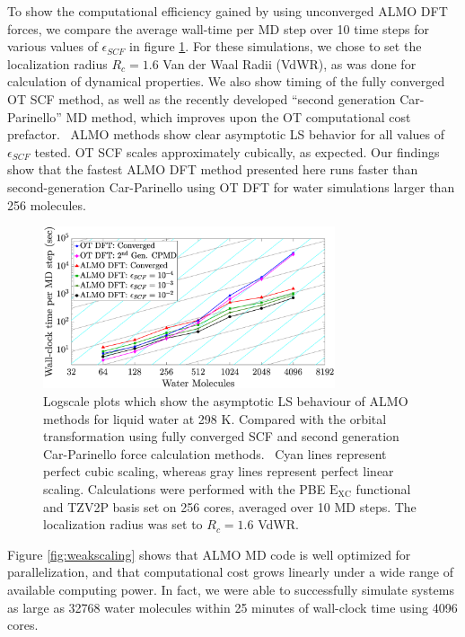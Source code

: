 \documentclass[10pt,aps,prl,twocolumn,amsmath,amssymb,superscriptaddress,longbibliography]{revtex4-1}
\begin{document}

To show the computational efficiency gained by using unconverged ALMO DFT forces, we compare the average wall-time per MD step over 10 time steps for various values of $\epsilon_{SCF}$ in figure \ref{fig:strongscaling_log}.
For these simulations, we chose to set the localization radius $R_{c} = 1.6$ Van der Waal Radii (VdWR), as was done for calculation of dynamical properties.
We also show timing of the fully converged OT SCF method, as well as the recently developed ``second generation Car-Parinello'' MD method, which improves upon the OT computational cost prefactor.~\cite{a:2ndcpmd}
ALMO methods show clear asymptotic LS behavior for all values of $\epsilon_{SCF}$ tested.
OT SCF scales approximately cubically, as expected.
Our findings show that the fastest ALMO DFT method presented here runs faster than second-generation Car-Parinello using OT DFT for water simulations larger than 256 molecules.

\begin{figure}
\includegraphics[trim={2.5cm 0.5cm 3.4cm 0.1cm},clip,width=8.6cm]{strongscaling_log.eps}
\caption{\label{fig:strongscaling_log} Logscale plots which show the asymptotic LS behaviour of ALMO methods for liquid water at 298 K.
Compared with the orbital transformation using fully converged SCF and second generation Car-Parinello force calculation methods.~\cite{a:ot,a:ot2,a:2ndcpmd}
Cyan lines represent perfect cubic scaling, whereas gray lines represent perfect linear scaling. 
Calculations were performed with the PBE $\mathrm{E_{XC}}$ functional and TZV2P basis set on 256 cores, averaged over 10 MD steps. 
The localization radius was set to $R_{c} = 1.6$ VdWR.}
\end{figure}

Figure \ref{fig:weakscaling} shows that ALMO MD code is well optimized for parallelization, and that computational cost grows linearly under a wide range of available computing power. 
In fact, we were able to successfully simulate systems as large as 32768 water molecules within 25 minutes of wall-clock time using 4096 cores.
\end{document}
